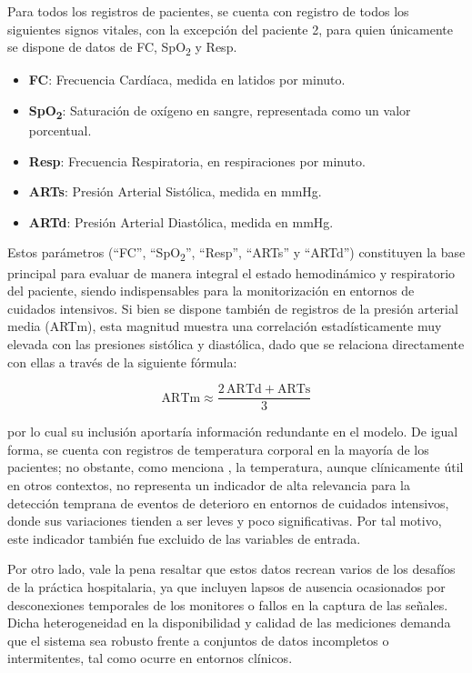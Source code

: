 Para todos los registros de pacientes, se cuenta con registro de todos los siguientes signos vitales, con la excepción del paciente 2, para quien únicamente se dispone de datos de FC, SpO\textsubscript{2} y Resp.

\begin{itemize}
  \item \textbf{FC}: Frecuencia Cardíaca, medida en latidos por minuto.
  \item \textbf{SpO\textsubscript{2}}: Saturación de oxígeno en sangre, representada como un valor porcentual.
  \item \textbf{Resp}: Frecuencia Respiratoria, en respiraciones por minuto.
  \item \textbf{ARTs}: Presión Arterial Sistólica, medida en mmHg.
  \item \textbf{ARTd}: Presión Arterial Diastólica, medida en mmHg.
\end{itemize}

Estos parámetros (“FC”, “SpO\textsubscript{2}”, “Resp”, “ARTs” y “ARTd”) constituyen la base principal para evaluar de manera integral el estado hemodinámico y respiratorio del paciente, siendo indispensables para la monitorización en entornos de cuidados intensivos. Si bien se dispone también de registros de la presión arterial media (ARTm), esta magnitud muestra una correlación estadísticamente muy elevada con las presiones sistólica y diastólica, dado que se relaciona directamente con ellas a través de la siguiente fórmula:

\[
  \mathrm{ARTm} \approx \frac{2\,\mathrm{ARTd} + \mathrm{ARTs}}{3}
\]

por lo cual su inclusión aportaría información redundante en el modelo. De igual forma, se cuenta con registros de temperatura corporal en la mayoría de los pacientes; no obstante, como menciona \textcite{Vargas2023}, la temperatura, aunque clínicamente útil en otros contextos, no representa un indicador de alta relevancia para la detección temprana de eventos de deterioro en entornos de cuidados intensivos, donde sus variaciones tienden a ser leves y poco significativas. Por tal motivo, este indicador también fue excluido de las variables de entrada.

Por otro lado, vale la pena resaltar que estos datos recrean varios de los desafíos de la práctica hospitalaria, ya que incluyen lapsos de ausencia ocasionados por desconexiones temporales de los monitores o fallos en la captura de las señales. Dicha heterogeneidad en la disponibilidad y calidad de las mediciones demanda que el sistema sea robusto frente a conjuntos de datos incompletos o intermitentes, tal como ocurre en entornos clínicos.

